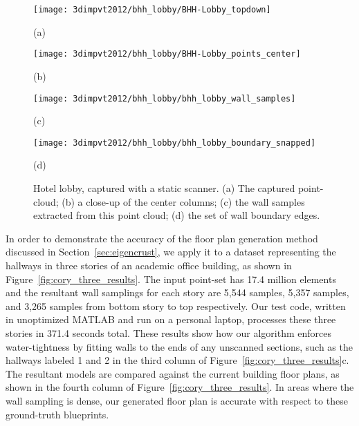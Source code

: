\documentclass[12pt,onecolumn,oneside]{book}
\begin{document}
\begin{figure}[t]

\centering
\begin{minipage}[b]{0.40\linewidth}
  \centering
  \centerline{\texttt{[image: 3dimpvt2012/bhh\_lobby/BHH-Lobby\_topdown]}}
  \centerline{(a)}
\end{minipage}
\begin{minipage}[b]{0.40\linewidth}
  \centering
  \centerline{\texttt{[image: 3dimpvt2012/bhh\_lobby/BHH-Lobby\_points\_center]}}
  \centerline{(b)}
\end{minipage}

\begin{minipage}[b]{0.35\linewidth}
  \centering
  \centerline{\texttt{[image: 3dimpvt2012/bhh\_lobby/bhh\_lobby\_wall\_samples]}}
  \centerline{(c)}
\end{minipage}
\begin{minipage}[b]{0.35\linewidth}
  \centering
  \centerline{\texttt{[image: 3dimpvt2012/bhh\_lobby/bhh\_lobby\_boundary\_snapped]}}
  \centerline{(d)}
\end{minipage}

\caption[Hotel lobby, captured with a static scanner.]{Hotel lobby, captured with a static scanner. (a) The captured point-cloud; (b) a close-up of the center columns; (c) the wall samples extracted from this point cloud; (d) the set of wall boundary edges.}
\label{fig:bhh_lobby_results}

\end{figure}

In order to demonstrate the accuracy of the floor plan generation method discussed in Section~\ref{sec:eigencrust}, we apply it to a dataset representing the hallways in three stories of an academic office building, as shown in Figure~\ref{fig:cory_three_results}.  The input point-set has 17.4 million elements and the resultant wall samplings for each story are 5,544 samples, 5,357 samples, and 3,265 samples from bottom story to top respectively.  Our test code, written in unoptimized MATLAB and run on a personal laptop, processes these three stories in 371.4 seconds total.  These results show how our algorithm enforces water-tightness by fitting walls to the ends of any unscanned sections, such as the hallways labeled 1 and 2 in the third column of Figure~\ref{fig:cory_three_results}c.  The resultant models are compared against the current building floor plans, as shown in the fourth column of Figure~\ref{fig:cory_three_results}.  In areas where the wall sampling is dense, our generated floor plan is accurate with respect to these ground-truth blueprints.
\end{document}
